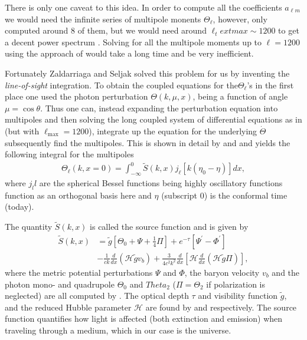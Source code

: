 \documentclass[twocolumn]{aastex62}
\begin{document}
There is only one caveat to this idea. In order to compute all the coefficients $a_{\ell m}$ we would need the infinite series of multipole monents $\Theta_\ell$, however, \cite{stutzer:2020c} only computed around 8 of them, but we would need around $\ell_text{max} \sim 1200$ to get a decent power spectrum \citep[]{winther:2020c}. Solving for all the multipole moments up to $\ell = 1200$ using the approach of \cite{stutzer:2020c} would take a long time and be very inefficient. 

Fortunately Zaldarriaga and Seljak solved this problem for us by inventing the \textit{line-of-sight} integration. To obtain the coupled equations for the$ \Theta_\ell$'s in the first place one used the photon perturbation $\Theta(k, \mu, x)$, being a function of angle $\mu = \cos \theta$. Thus one can, instead expanding the perturbation equation into multipoles and then solving the long coupled system of differential equations as in \cite{stutzer:2020c} (but with $\ell_\text{max} = 1200$), integrate up the equation for the underlying $\dot{\Theta}$ subsequently find the multipoles. This is shown in detail by \cite{callin:2006} and \cite{dodelson:2003} and yields the following integral for the multipoles 
\begin{align}
    \Theta_\ell(k, x=0) = \int_{-\infty}^{0} \tilde{S}(k,x)
              j_\ell[k(\eta_0-\eta)] dx,
\end{align} 
where $j_ll$ are the spherical Bessel functions being highly oscillatory functions function as an orthogonal basis here and $\eta$ (subscript 0) is the conformal time (today). 

The quantity $\tilde{S}(k,x)$ is called the source function and is given by
\begin{align}
    \tilde{S}(k,x) &= \tilde{g}\left[ \Theta_0 + \Psi + \frac{1}{4}\Pi\right] + e^{-\tau} \left[\Psi^\prime-\Phi^\prime\right] \nonumber\\
    &- \frac{1}{ck}\frac{d}{dx}(\mathcal{H}\tilde{g}v_b) + \frac{3}{4c^2k^2} \frac{d}{dx} \left[\mathcal{H}\frac{d}{dx} (\mathcal{H}\tilde{g}\Pi)\right],
    \label{eq:source}
\end{align}
where the metric potential perturbations $\Psi$ and $\Phi$, the baryon velocity $v_b$ and the photon mono- and quadrupole $\Theta_0$ and $Theta_2$ ($\Pi = \Theta_2$ if polarization is neglected) are all computed by \cite{stutzer:2020c}. The optical depth $\tau$ and visibility function $\tilde{g}$, and the reduced Hubble parameter $\mathcal{H}$ are found by \cite{stutzer:2020b} and \cite{stutzer:2020a} respectively. The source function quantifies how light is affected (both extinction and emission) when traveling through a medium, which in our case is the universe.
\end{document}
